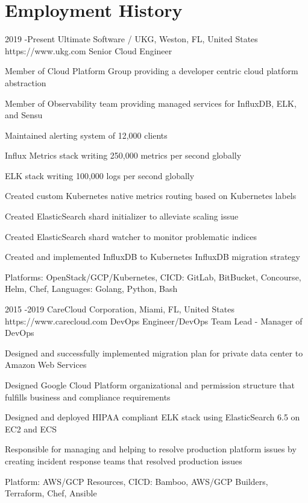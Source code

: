 \documentclass[10pt]{article} %
\begin{document}
\section{Employment History}

\job
{2019 -}{Present}
{Ultimate Software / UKG, Weston, FL, United States}
{https://www.ukg.com}
{Senior Cloud Engineer}
{\begin{itemize-noindent}
\item{Member of Cloud Platform Group providing a developer centric cloud platform abstraction}
\item{Member of Observability team providing managed services for InfluxDB, ELK, and Sensu}
\item{Maintained alerting system of 12,000 clients}
\item{Influx Metrics stack writing 250,000 metrics per second globally}
\item{ELK stack writing 100,000 logs per second globally}
\item{Created custom Kubernetes native metrics routing based on Kubernetes labels}
\item{Created ElasticSearch shard initializer to alleviate scaling issue}
\item{Created ElasticSearch shard watcher to monitor problematic indices}
\item{Created and implemented InfluxDB to Kubernetes InfluxDB migration strategy}
\item{Platforms: OpenStack/GCP/Kubernetes, CICD: GitLab, BitBucket, Concourse, Helm, Chef, Languages: Golang, Python, Bash}
\end{itemize-noindent}}

\job
{2015 -}{2019}
{CareCloud Corporation, Miami, FL, United States}
{https://www.carecloud.com}
{DevOps Engineer/DevOps Team Lead - Manager of DevOps}
{\begin{itemize-noindent}
\item{Designed and successfully implemented migration plan for private data center to Amazon Web Services}
\item{Designed Google Cloud Platform organizational and permission structure that fulfills business and compliance requirements}
\item{Designed and deployed HIPAA compliant ELK stack using ElasticSearch 6.5 on EC2 and ECS}
\item{Responsible for managing and helping to resolve production platform issues by creating incident response teams that resolved production issues}
\item{Platform: AWS/GCP Resources, CICD: Bamboo, AWS/GCP Builders, Terraform, Chef, Ansible}
\end{itemize-noindent}}
\end{document}
